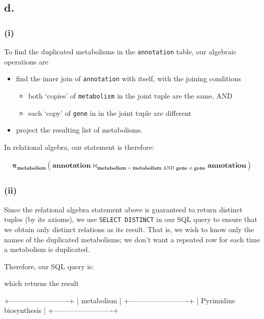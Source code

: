 \documentclass{article}
\begin{document}
\subsection{d.}

\subsubsection{(i)}

To find the duplicated metabolisms in the \texttt{annotation} table, our algebraic operations are
\begin{itemize}
    \item find the inner join of \texttt{annotation} with itself, with the joining conditions
    \begin{itemize}
        \item both `copies' of \texttt{metabolism} in the joint tuple are the same, AND
        \item each `copy' of \texttt{gene} in in the joint tuple are different
    \end{itemize}
    \item project the resulting list of metabolisms.
\end{itemize}

In relational algebra, our statement is therefore:

$$
\begin{aligned}
\boldsymbol{\pi}_\mathbf{metabolism}
\left(
    \mathbf{annotation} \bowtie_{\mathbf{metabolism} = \mathbf{metabolism} \text{ AND }
        \mathbf{gene} \ne \mathbf{gene}} \mathbf{annotation}
\right)
\end{aligned}
$$

\subsubsection{(ii)}

Since the relational algebra statement above is guaranteed to return distinct tuples (by its axioms), we use \texttt{SELECT DISTINCT} in our SQL query to ensure that we obtain only distinct relations as its result. That is, we wish to know only the names of the duplicated metabolisms; we don't want a repeated row for each time a metabolism is duplicated.

Therefore, our SQL query is:


which returns the result

\begin{bashinline}
+-------------------------+
| metabolism              |
+-------------------------+
| Pyrimidine biosynthesis |
+-------------------------+ 
\end{bashinline}
\end{document}
